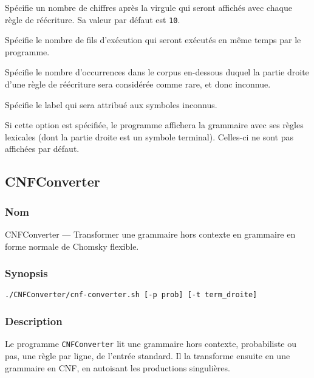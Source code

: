 \documentclass[12pt]{article}
\begin{document}
\begin{description}[style=nextline]
\item[\texttt{-p, --precision precision}] Sp\'ecifie un nombre de chiffres apr\`es
la virgule qui seront affich\'es avec chaque r\`egle de r\'e\'ecriture. Sa valeur par d\'efaut est
\texttt{10}.
\item[\texttt{-t, --nthreads threads}] Sp\'ecifie le nombre de fils d'ex\'ecution
qui seront ex\'ecut\'es en m\^eme temps par le programme.
\item[\texttt{-u, --unknown-threshold unknown\_threshold}] Sp\'ecifie le nombre
d'occurrences dans le corpus en-dessous duquel la partie droite d'une r\`egle de
r\'e\'ecriture sera consid\'er\'ee comme rare, et donc inconnue.
\item[\texttt{-s, --unknown-label unknown\_label}] Sp\'ecifie le label qui sera
attribu\'e aux symboles inconnus.
\item[\texttt{-l, --lexical}] Si cette option est sp\'ecifi\'ee, le programme
affichera la grammaire avec ses r\`egles lexicales (dont la partie droite est un
symbole terminal). Celles-ci ne sont pas affich\'ees par d\'efaut.
\end{description}

\subsection{CNFConverter}
\subsubsection{Nom}

CNFConverter --- Transformer une grammaire hors contexte en grammaire en forme
normale de Chomsky flexible.

\subsubsection{Synopsis}

{\ttfamily
\begin{verbatim}
./CNFConverter/cnf-converter.sh [-p prob] [-t term_droite]
\end{verbatim}
}

\subsubsection{Description}

Le programme \texttt{CNFConverter} lit une grammaire hors contexte, probabiliste
ou pas, une r\`egle par ligne, de l'entr\'ee standard.
Il la transforme ensuite en une grammaire en CNF, en autoisant les productions
singuli\`eres.
\end{document}
